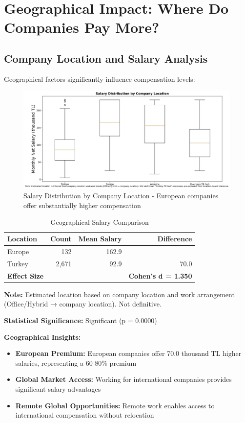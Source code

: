 \documentclass[12pt,a4paper]{article}
\begin{document}
\section{Geographical Impact: Where Do Companies Pay More?}

\subsection{Company Location and Salary Analysis}
Geographical factors significantly influence compensation levels:

\begin{figure}[H]
    \centering
    \includegraphics[width=\textwidth]{figures/boxplot_company_location.png}
    \caption{Salary Distribution by Company Location - European companies offer substantially higher compensation}
\end{figure}

\begin{table}[H]
\centering
\begin{tabular}{lrrr}
\toprule
\textbf{Location} & \textbf{Count} & \textbf{Mean Salary} & \textbf{Difference} \\
\midrule
Europe & 132 & 162.9 & \\
Turkey & 2,671 & 92.9 & 70.0 \\
\midrule
\textbf{Effect Size} & & & \textbf{Cohen's d = 1.350} \\
\bottomrule
\end{tabular}
\caption{Geographical Salary Comparison}
\end{table}

\textbf{Note:} Estimated location based on company location and work arrangement (Office/Hybrid → company location). Not definitive.

\textbf{Statistical Significance:} Significant (p = 0.0000)

\textbf{Geographical Insights:}
\begin{itemize}
    \item \textbf{European Premium:} European companies offer 70.0 thousand TL higher salaries, representing a 60-80\% premium
    \item \textbf{Global Market Access:} Working for international companies provides significant salary advantages
    \item \textbf{Remote Global Opportunities:} Remote work enables access to international compensation without relocation
\end{itemize}
\end{document}
